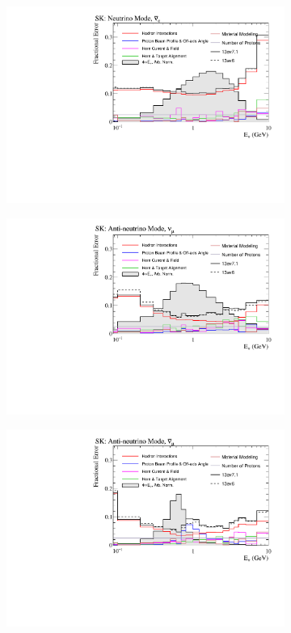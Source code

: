 \begin{figure}[!htbp]
\begin{subfigure}{.49\textwidth}
\end{subfigure}
\begin{subfigure}{.49\textwidth}
  \centering
  \includegraphics[width=0.99\linewidth]{figs/flux_error_t2k_sk_fhc_nuebar}
\end{subfigure}
\begin{subfigure}{.49\textwidth}
  \centering
  \includegraphics[width=0.99\linewidth]{figs/flux_error_t2k_sk_rhc_numu}
\end{subfigure}
\begin{subfigure}{.49\textwidth}
  \centering
  \includegraphics[width=0.99\linewidth]{figs/flux_error_t2k_sk_rhc_numubar}

\end{subfigure}
\end{figure}

